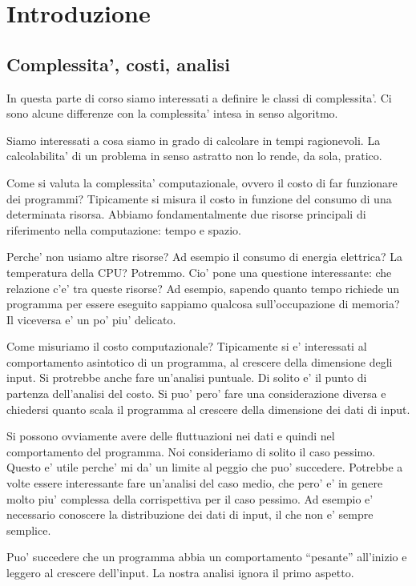 \chapter{Introduzione}

\section{Complessita', costi, analisi}

In questa parte di corso siamo interessati a definire le classi di complessita'. Ci sono alcune
differenze con la complessita' intesa in senso algoritmo.

Siamo interessati a cosa siamo in grado di calcolare in tempi ragionevoli. La calcolabilita' di un
problema in senso astratto non lo rende, da sola, pratico.

Come si valuta la complessita' computazionale, ovvero il costo di far funzionare dei programmi?
Tipicamente si misura il costo in funzione del consumo di una determinata risorsa. Abbiamo
fondamentalmente due risorse principali di riferimento nella computazione: tempo e spazio.

Perche' non usiamo altre risorse? Ad esempio il consumo di energia elettrica? La temperatura della
CPU? Potremmo. Cio' pone una questione interessante: che relazione c'e' tra queste risorse? Ad
esempio, sapendo quanto tempo richiede un programma per essere eseguito sappiamo qualcosa
sull'occupazione di memoria? Il viceversa e' un po' piu' delicato.

Come misuriamo il costo computazionale? Tipicamente si e' interessati al comportamento asintotico di
un programma, al crescere della dimensione degli input. Si protrebbe anche fare un'analisi puntuale.
Di solito e' il punto di partenza dell'analisi del costo. Si puo' pero' fare una considerazione
diversa e chiedersi quanto scala il programma al crescere della dimensione dei dati di input.

Si possono ovviamente avere delle fluttuazioni nei dati e quindi nel comportamento del programma.
Noi consideriamo di solito il caso pessimo. Questo e' utile perche' mi da' un limite al peggio che
puo' succedere. Potrebbe a volte essere interessante fare un'analisi del caso medio, che pero' e' in
genere molto piu' complessa della corrispettiva per il caso pessimo. Ad esempio e' necessario
conoscere la distribuzione dei dati di input, il che non e' sempre semplice.

Puo' succedere che un programma abbia un comportamento ``pesante'' all'inizio e leggero al crescere
dell'input. La nostra analisi ignora il primo aspetto.


